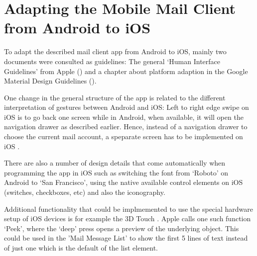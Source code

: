 \documentclass[a4paper,11pt,twoside]{article}
\begin{document}
\section{Adapting the Mobile Mail Client from Android to iOS}
To adapt the described mail client app from Android to iOS, mainly two documents
were consulted as guidelines: The general `Human Interface Guidelines' from
Apple (\cite{apple_ios_design}) and a chapter about platform adaption in the
Google Material Design Guidelines (\cite{adapt_ios}).

One change in the general structure of the app is related to the different
interpretation of gestures between Android and iOS: Left to right edge swipe
on iOS is to go back one screen while in Android, when available, it will open
the navigation drawer as described earlier. Hence, instead of a navigation drawer
to choose the current mail account, a speparate screen has to be implemented
on iOS \cite{adapt_ios}.

There are also a number of design details that come automatically when programming
the app in iOS such as switching the font from `Roboto' on Android to
`San Francisco', using the native available control elements on iOS (switches,
checkboxes, etc) and also the iconography.

Additional functionality that could be implmemented to use the special hardware
setup of iOS devices is for example the 3D Touch \cite{apple_ios_3dtouch}. Apple
calls one such function `Peek', where the `deep' press opens a preview of the
underlying object. This could be used in the 'Mail Message List' to show the
first 5 lines of text instead of just one which is the default of the list element.



\end{document}

